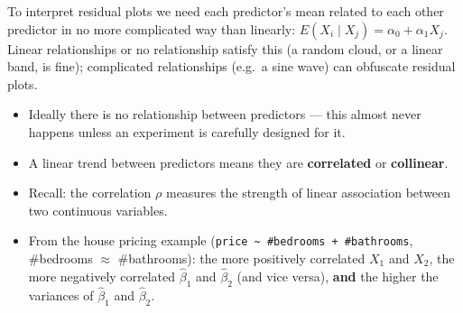 \begin{remark}
    To interpret residual plots we need each predictor's mean related to each other predictor
    in no more complicated way than linearly: $E(X_i\mid X_j)=\alpha_0+\alpha_1X_j$. Linear
    relationships or no relationship satisfy this (a random cloud, or a linear band, is fine);
    complicated relationships (e.g.\ a sine wave) can obfuscate residual plots.
\end{remark}

\begin{remark}
    \begin{itemize}
        \item Ideally there is no relationship between predictors --- this almost never happens
        unless an experiment is carefully designed for it.
        \item A linear trend between predictors means they are \textbf{correlated} or
        \textbf{collinear}.
        \item Recall: the correlation $\rho$ measures the strength of linear association between
        two continuous variables.
        \item From the house pricing example (\texttt{price \textasciitilde{} \#bedrooms + \#bathrooms},
        \#bedrooms $\approx$ \#bathrooms): the more positively correlated $X_1$ and $X_2$, the more
        negatively correlated $\hat\beta_1$ and $\hat\beta_2$ (and vice versa), \textbf{and} the higher
        the variances of $\hat\beta_1$ and $\hat\beta_2$.
    \end{itemize}
\end{remark}


